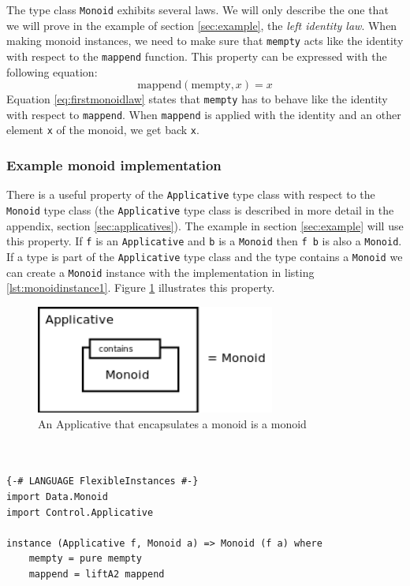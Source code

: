 The type class \verb|Monoid| exhibits several laws. We will only describe the one that we will prove in the example of section \ref{sec:example}, the \emph{left identity law}.
When making monoid instances, we need to make sure that \verb|mempty| acts like the identity with respect to the \verb|mappend| function. This property can be expressed with the following equation:
\begin{equation}
  \label{eq:firstmonoidlaw}
  \text{mappend}(\text{mempty}, x) = x
\end{equation}
Equation \ref{eq:firstmonoidlaw} states that \verb|mempty| has to behave like the identity with respect to \verb|mappend|. When \verb|mappend| is applied with the identity and an other element \verb|x| of the monoid, we get back \verb|x|.

\subsubsection{Example monoid implementation}

There is a useful property of the \verb|Applicative| type class with respect to the \verb|Monoid| type class (the \verb|Applicative| type class is described in more detail in the appendix, section \ref{sec:applicatives}). The example in section \ref{sec:example} will use this property. If \verb|f| is an \verb|Applicative| and \verb|b| is a \verb|Monoid| then \verb|f b| is also a \verb|Monoid|. If a type is part of the \verb|Applicative| type class and the type contains a \verb|Monoid| we can create a \verb|Monoid| instance with the implementation in listing \ref{lst:monoidinstance1}. Figure \ref{fig:applicative_monoid} illustrates this property.

\begin{figure}
  \centering
     \includegraphics[width=0.7\textwidth]{monoid}
  \caption{An Applicative that encapsulates a monoid is a monoid}
  \label{fig:applicative_monoid}
\end{figure}

\lstset{
basicstyle=\ttfamily,
columns=fullflexible,
keepspaces=true,
captionpos=b
}
\begin{lstlisting}[caption={{\ttfamily Monoid} instance implementation of {\ttfamily IO}},label={lst:monoidinstance1}]


{-# LANGUAGE FlexibleInstances #-} 
import Data.Monoid
import Control.Applicative 

instance (Applicative f, Monoid a) => Monoid (f a) where
    mempty = pure mempty
    mappend = liftA2 mappend
\end{lstlisting}

